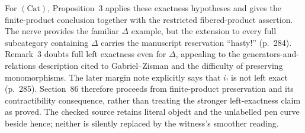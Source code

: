 For $(\mathrm{Cat})$, Proposition~3 applies these exactness hypotheses and gives the finite-product conclusion together with the restricted fibered-product assertion. The nerve provides the familiar $\Delta$ example, but the extension to every full subcategory containing $\Delta$ carries the manuscript reservation “hasty!” (p.\ 284). Remark~3 doubts full left exactness even for $\Delta$, appealing to the generators-and-relations description cited to Gabriel--Zisman and the difficulty of preserving monomorphisms. The later margin note explicitly says that $i_!$ is not left exact (p.\ 285). Section~86 therefore proceeds from finite-product preservation and its contractibility consequence, rather than treating the stronger left-exactness claim as proved. The checked source retains literal objedt and the unlabelled pen curve beside hence; neither is silently replaced by the witness's smoother reading.



